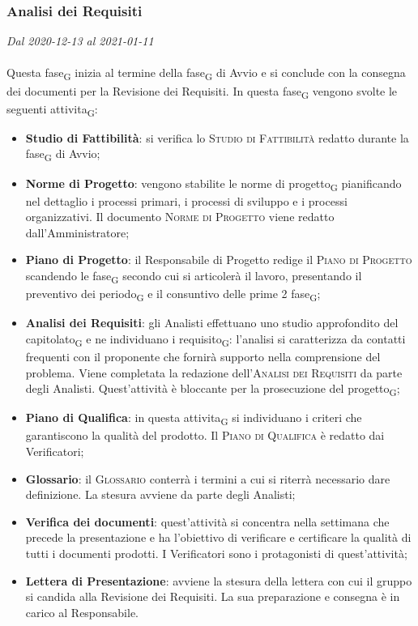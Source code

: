 \subsubsection{Analisi dei Requisiti}

\textit{Dal 2020-12-13 al 2021-01-11}
\\\\
Questa fase\textsubscript{G} inizia al termine della fase\textsubscript{G} di Avvio e si conclude con la consegna dei documenti per la Revisione dei Requisiti.
In questa fase\textsubscript{G} vengono svolte le seguenti attivita\textsubscript{G}:
\begin{itemize}
	\item \textbf{Studio di Fattibilità}: si verifica lo \textsc{Studio di Fattibilità} redatto durante la fase\textsubscript{G} di Avvio;
	\item \textbf{Norme di Progetto}: vengono stabilite le norme di progetto\textsubscript{G} pianificando nel dettaglio i processi primari, i processi di sviluppo e i processi organizzativi. Il documento \textsc{Norme di Progetto} viene redatto dall'Amministratore;
	\item \textbf{Piano di Progetto}: il Responsabile di Progetto redige il \textsc{Piano di Progetto} scandendo le fase\textsubscript{G} secondo cui si articolerà il lavoro, presentando il preventivo dei periodo\textsubscript{G} e il consuntivo delle prime 2 fase\textsubscript{G};
	\item \textbf{Analisi dei Requisiti}: gli Analisti effettuano uno studio approfondito del capitolato\textsubscript{G} e ne individuano i requisito\textsubscript{G}: l'analisi si caratterizza da contatti frequenti con il proponente che fornirà supporto nella comprensione del problema. Viene completata la redazione dell'\textsc{Analisi dei Requisiti} da parte degli Analisti. Quest'attività è bloccante per la prosecuzione del progetto\textsubscript{G};
	\item \textbf{Piano di Qualifica}: in questa attivita\textsubscript{G} si individuano i criteri che garantiscono la qualità del prodotto. Il \textsc{Piano di Qualifica} è redatto dai Verificatori;
	\item \textbf{Glossario}: il \textsc{Glossario} conterrà i termini a cui si riterrà necessario dare definizione. La stesura avviene da parte degli Analisti;
	\item \textbf{Verifica dei documenti}: quest'attività si concentra nella settimana che precede la presentazione e ha l'obiettivo di verificare e certificare la qualità di tutti i documenti prodotti. I Verificatori sono i protagonisti di quest'attività;
	\item \textbf{Lettera di Presentazione}: avviene la stesura della lettera con cui il gruppo si candida alla Revisione dei Requisiti. La sua preparazione e consegna è in carico al Responsabile.
\end{itemize}

